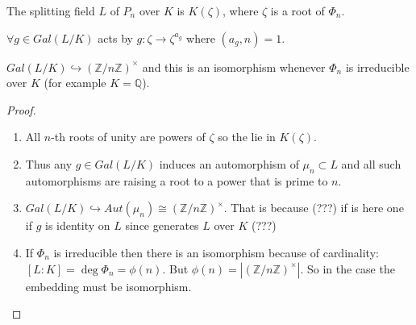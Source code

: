 \begin{theorem}
  The splitting field $L$ of $P_n$ over $K$ is $K\left(\zeta\right)$,
  where $\zeta$ is a root of $\Phi_n$.

  $\forall g \in Gal\left(L/K\right)$ acts by $g: \zeta \to
  \zeta^{a_g}$ where $\left(a_g, n\right) = 1$.

  $Gal\left(L/K\right)  \hookrightarrow
  \left(\mathbb{Z}/n\mathbb{Z}\right)^\times$ and this is an isomorphism
  whenever $\Phi_n$ is irreducible over $K$ (for example $K
  =\mathbb{Q}$). 
  \begin{proof}
    \begin{enumerate}
      \item All $n$-th roots of unity are powers of $\zeta$ so the lie
        in  $K\left(\zeta\right)$.
      \item Thus any $g \in Gal\left(L/K\right)$ induces an
        automorphism of $\mu_n \subset L$ and all such automorphisms
        are raising a root to a power that is prime to $n$.
      \item $Gal\left(L/K\right)  \hookrightarrow
        Aut\left(\mu_n\right) \cong 
        \left(\mathbb{Z}/n\mathbb{Z}\right)^\times$. That is because (???)
         if is here one if $g$ is identity on $L$ since generates $L$
         over $K$ (???)
       \item If $\Phi_n$ is irreducible then there is an isomorphism
         because of cardinality: $\left[L:K\right] = \deg \Phi_n =
         \phi\left(n\right)$. But
         $\phi\left(n\right) =
         \left|\left(\mathbb{Z}/n\mathbb{Z}\right)^\times\right|$. So in
         the case the embedding must be isomorphism. 
    \end{enumerate}    
  \end{proof}
  \label{thm:lec6_3}
\end{theorem}
